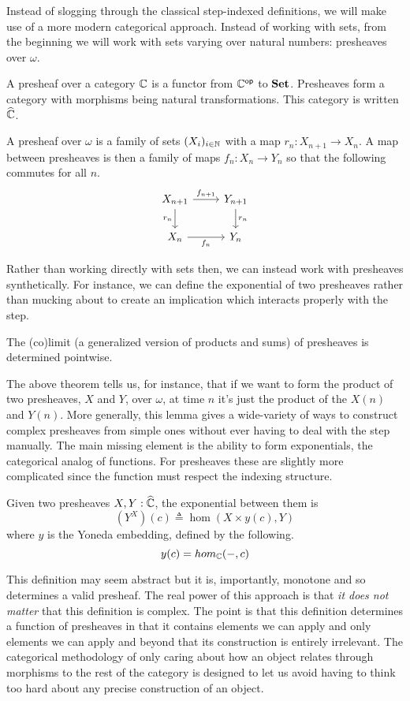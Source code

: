 Instead of slogging through the classical step-indexed definitions, we
will make use of a more modern categorical approach. Instead of
working with sets, from the beginning we will work with sets varying
over natural numbers: presheaves over $\omega$.
\begin{defn}
  A presheaf over a category $\mathbb{C}$ is a functor from $\mathbb{C}^{\mathsf{op}}$ to
  $\mathbf{Set}$. Presheaves form a category with morphisms being natural
  transformations. This category is written $\widehat{\mathbb{C}}$.
\end{defn}
\begin{example}
  A presheaf over $\omega$ is a family of sets $(X_i)_{i \in \mathbb{N}}$
  with a map $r_n : X_{n + 1} \to X_n$. A map between presheaves is
  then a family of maps $f_n : X_n \to Y_n$ so that the following
  commutes for all $n$.
  \[
    \begin{tikzcd}
      X_{n + 1} \ar[r, "f_{n + 1}"] \ar[d, swap, "r_n"] & Y_{n + 1} \ar[d, "r_n"]\\
      X_n \ar[r, swap, "f_n"] & Y_n
    \end{tikzcd}
  \]
\end{example}
Rather than working directly with sets then, we can instead work with
presheaves synthetically. For instance, we can define the exponential
of two presheaves rather than mucking about to create an implication
which interacts properly with the step.
\begin{lem}
  The (co)limit (a generalized version of products and sums) of
  presheaves is determined pointwise.
\end{lem}
The above theorem tells us, for instance, that if we want to form the
product of two presheaves, $X$ and $Y$, over $\omega$, at time $n$ it's just the
product of the $X(n)$ and $Y(n)$. More generally, this lemma gives a
wide-variety of ways to construct complex presheaves from simple ones
without ever having to deal with the step manually. The main missing
element is the ability to form exponentials, the categorical analog of
functions. For presheaves these are slightly more complicated since
the function must respect the indexing structure.
\begin{lem}
  Given two presheaves $X, Y : \widehat{\mathbb{C}}$, the exponential
  between them is
  \[
    (Y^X)(c) \triangleq \hom(X \times y(c), Y)
  \]
  where $y$ is the Yoneda embedding, defined by the following.
  \[
    y(c) = hom_{\mathbb{C}}(-, c)
  \]
\end{lem}
This definition may seem abstract but it is, importantly,
monotone and so determines a valid presheaf. The real power of this
approach is that \emph{it does not matter} that this definition is
complex. The point is that this definition determines a function of
presheaves in that it contains elements we can apply and only elements
we can apply and beyond that its construction is entirely
irrelevant. The categorical methodology of only caring about how an
object relates through morphisms to the rest of the category is
designed to let us avoid having to think too hard about any precise
construction of an object. %

